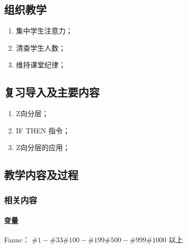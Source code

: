 \jxhj{%
	}
\skrq{%
	}

\makeshouye %

\subsection{组织教学}
\begin{enumerate}[\hspace{2em}1、]
	\item 集中学生注意力；
	\item 清查学生人数；
	\item 维持课堂纪律；
\end{enumerate}
\subsection{复习导入及主要内容}
\begin{enumerate}[\hspace{2em}1、]
\item Z向分层；
\item IF THEN 指令；
\item Z向分层的应用；
\end{enumerate}


\subsection{教学内容及过程}


\subsubsection{相关内容}
\paragraph{变量}
Fanuc： $\#1-\#33 \#100-\#199  \#500-\#999 \#1000$ 以上

